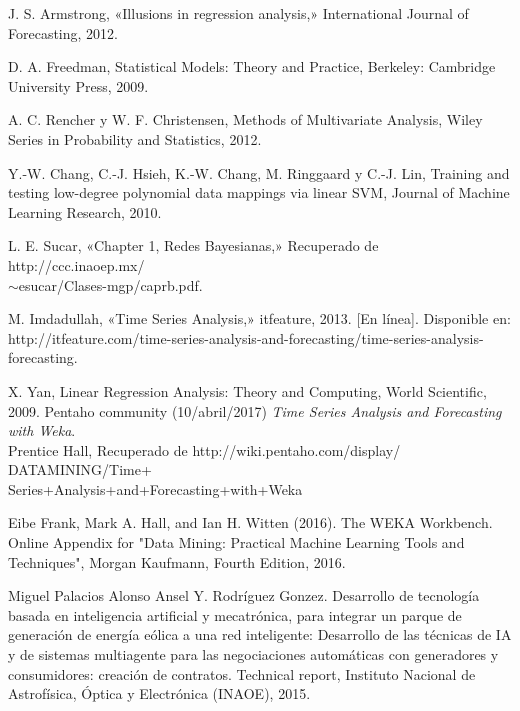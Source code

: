 \begin{thebibliography}{a}
	 J. S. Armstrong, «Illusions in regression analysis,» International Journal of Forecasting, 2012.

	 D. A. Freedman, Statistical Models: Theory and Practice, Berkeley: Cambridge University Press, 2009.
		
	 A. C. Rencher y W. F. Christensen, Methods of Multivariate Analysis, Wiley Series in Probability and Statistics, 2012.

	 Y.-W. Chang, C.-J. Hsieh, K.-W. Chang, M. Ringgaard y C.-J. Lin, Training and testing low-degree
polynomial data mappings via linear SVM, Journal of Machine Learning Research, 2010.
	
	 L. E. Sucar, «Chapter 1, Redes Bayesianas,» Recuperado de
	http://ccc.inaoep.mx/\\$\sim$esucar/Clases-mgp/caprb.pdf. %

	 M. Imdadullah, «Time Series Analysis,» itfeature, 2013. [En línea]. Disponible en:
http://itfeature.com/time-series-analysis-and-forecasting/time-series-analysis-forecasting.

	 X. Yan, Linear Regression Analysis: Theory and Computing, World Scientific,
2009.
	  Pentaho community (10/abril/2017) {\it Time Series Analysis and
	Forecasting with Weka}.\\ Prentice Hall, Recuperado de http://wiki.pentaho.com/display/
	DATAMINING/Time+\\Series+Analysis+and+Forecasting+with+Weka
	
	
	Eibe Frank, Mark A. Hall, and Ian H. Witten (2016). The WEKA Workbench. Online Appendix for "Data Mining: Practical Machine Learning Tools and Techniques", Morgan Kaufmann, Fourth Edition, 2016. 
	
	 Miguel Palacios Alonso Ansel Y. Rodríguez Gonzez. Desarrollo de tecnología basada en inteligencia artificial y mecatrónica, para integrar un parque de generación de energía eólica a una red inteligente: 
	Desarrollo de las técnicas de IA y de sistemas multiagente para las negociaciones automáticas con generadores y consumidores: creación de contratos.
	Technical report, Instituto Nacional de Astrofísica, Óptica y Electrónica (INAOE), 2015.
	

\end{thebibliography}
